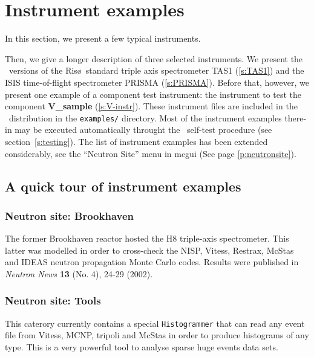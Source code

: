 
\chapter{Instrument examples}
\label{s:instrument}

In this section, we present a few typical instruments.

Then, we give a longer description of three selected
instruments. We present the \MCS\ versions of
the Ris\o\ standard triple axis spectrometer TAS1 (\ref{s:TAS1})
and the ISIS time-of-flight spectrometer PRISMA (\ref{s:PRISMA}).
Before that, however, we present one example of a component
test instrument: the instrument to test the component
{\bf V\_sample} (\ref{s:V-instr}).
%
These instrument files are included in the \MCS\ distribution
in the \verb+examples/+ directory.
Most of the instrument examples there-in may be executed automatically throught the \MCS\ self-test procedure (see section~\ref{s:testing}).
The list of instrument examples has been extended considerably, see
the ``Neutron Site'' menu in mcgui (See page \ref{p:neutronsite}).

\section{A quick tour of instrument examples}
\label{s:quick-tour-instr}

\subsection{Neutron site: Brookhaven}

The former Brookhaven reactor hosted the H8 triple-axis spectrometer. This latter was modelled in order to cross-check the NISP, Vitess, Restrax, McStas and IDEAS neutron propagation Monte Carlo codes. Results were published in {\it Neutron News} {\bf 13} (No. 4), 24-29 (2002).

\subsection{Neutron site: Tools}

This caterory currently contains a special \verb+Histogrammer+ that can read any event file from Vitess, MCNP, tripoli and McStas in order to produce histograms of any type. This is a very powerful tool to analyse sparse huge events data sets.


